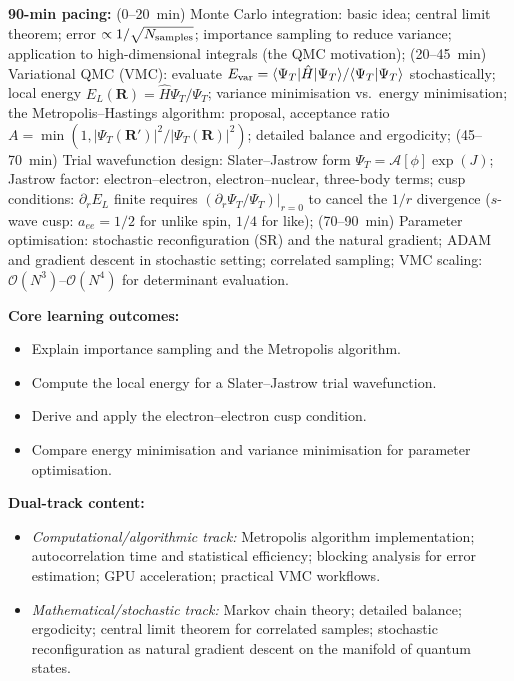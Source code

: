 \documentclass[11pt,a4paper]{article}
\begin{document}
\begin{tcolorbox}[modulebox, title={Module~II.1 / L05: Quantum Monte Carlo I --- Variational QMC}]
\textbf{90-min pacing:} (0--20~min) Monte Carlo integration: basic idea; central limit theorem;
error $\propto 1/\sqrt{N_{\rm samples}}$; importance sampling to reduce variance;
application to high-dimensional integrals (the QMC motivation);
(20--45~min) Variational QMC (VMC): evaluate $E_{\rm var}=\langle\Psi_T|\hat{H}|\Psi_T\rangle/
\langle\Psi_T|\Psi_T\rangle$ stochastically; local energy $E_L(\mathbf{R})=\hat{H}\Psi_T/\Psi_T$;
variance minimisation vs.\ energy minimisation;
the Metropolis--Hastings algorithm: proposal, acceptance ratio
$A=\min(1,|\Psi_T(\mathbf{R}')|^2/|\Psi_T(\mathbf{R})|^2)$;
detailed balance and ergodicity;
(45--70~min) Trial wavefunction design: Slater--Jastrow form
$\Psi_T=\mathcal{A}[\phi]\exp(J)$;
Jastrow factor: electron--electron, electron--nuclear, three-body terms;
cusp conditions: $\partial_r E_L$ finite requires $(\partial_r\Psi_T/\Psi_T)|_{r=0}$ to
cancel the $1/r$ divergence ($s$-wave cusp: $a_{ee}=1/2$ for unlike spin, $1/4$ for like);
(70--90~min) Parameter optimisation: stochastic reconfiguration (SR) and the natural
gradient; ADAM and gradient descent in stochastic setting; correlated sampling;
VMC scaling: $\mathcal{O}(N^3)$--$\mathcal{O}(N^4)$ for determinant evaluation.

\medskip\textbf{Core learning outcomes:}
\begin{itemize}[leftmargin=1.4em,topsep=2pt,itemsep=1pt]
  \item Explain importance sampling and the Metropolis algorithm.
  \item Compute the local energy for a Slater--Jastrow trial wavefunction.
  \item Derive and apply the electron--electron cusp condition.
  \item Compare energy minimisation and variance minimisation for parameter optimisation.
\end{itemize}

\medskip\textbf{Dual-track content:}
\begin{itemize}[leftmargin=1.4em,topsep=2pt,itemsep=1pt]
  \item \textit{Computational/algorithmic track:} Metropolis algorithm implementation;
    autocorrelation time and statistical efficiency; blocking analysis for error estimation;
    GPU acceleration; practical VMC workflows.
  \item \textit{Mathematical/stochastic track:} Markov chain theory; detailed balance;
    ergodicity; central limit theorem for correlated samples; stochastic reconfiguration
    as natural gradient descent on the manifold of quantum states.
\end{itemize}


\end{tcolorbox}
\end{document}
